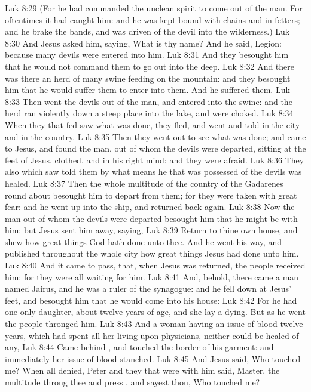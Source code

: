 \vs Luk 8:29 (For he had commanded the unclean spirit to come out of the man. For oftentimes it had caught him: and he was kept bound with chains and in fetters; and he brake the bands, and was driven of the devil into the wilderness.)
\vs Luk 8:30 And Jesus asked him, saying, What is thy name? And he said, Legion: because many devils were entered into him.
\vs Luk 8:31 And they besought him that he would not command them to go out into the deep.
\vs Luk 8:32 And there was there an herd of many swine feeding on the mountain: and they besought him that he would suffer them to enter into them. And he suffered them.
\vs Luk 8:33 Then went the devils out of the man, and entered into the swine: and the herd ran violently down a steep place into the lake, and were choked.
\vs Luk 8:34 When they that fed  saw what was done, they fled, and went and told  in the city and in the country.
\vs Luk 8:35 Then they went out to see what was done; and came to Jesus, and found the man, out of whom the devils were departed, sitting at the feet of Jesus, clothed, and in his right mind: and they were afraid.
\vs Luk 8:36 They also which saw  told them by what means he that was possessed of the devils was healed.
\vs Luk 8:37 Then the whole multitude of the country of the Gadarenes round about besought him to depart from them; for they were taken with great fear: and he went up into the ship, and returned back again.
\vs Luk 8:38 Now the man out of whom the devils were departed besought him that he might be with him: but Jesus sent him away, saying,
\vs Luk 8:39 Return to thine own house, and shew how great things God hath done unto thee. And he went his way, and published throughout the whole city how great things Jesus had done unto him.
\vs Luk 8:40 And it came to pass, that, when Jesus was returned, the people  received him: for they were all waiting for him.
\vs Luk 8:41 And, behold, there came a man named Jairus, and he was a ruler of the synagogue: and he fell down at Jesus' feet, and besought him that he would come into his house:
\vs Luk 8:42 For he had one only daughter, about twelve years of age, and she lay a dying. But as he went the people thronged him.
\vs Luk 8:43 And a woman having an issue of blood twelve years, which had spent all her living upon physicians, neither could be healed of any,
\vs Luk 8:44 Came behind , and touched the border of his garment: and immediately her issue of blood stanched.
\vs Luk 8:45 And Jesus said, Who touched me? When all denied, Peter and they that were with him said, Master, the multitude throng thee and press , and sayest thou, Who touched me?
